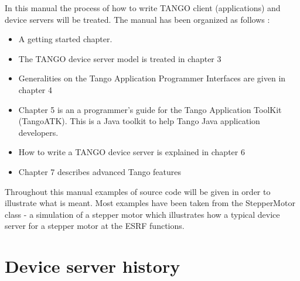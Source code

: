 In this manual the process of how to write TANGO client (applications)
and device servers will be treated. The manual has been organized
as follows :
\begin{itemize}
\item A getting started chapter. 
\item The TANGO device server model is treated in chapter 3 
\item Generalities on the Tango Application Programmer Interfaces are given
in chapter 4 
\item Chapter 5 is an a programmer's guide for the Tango Application ToolKit
(TangoATK). This is a Java toolkit to help Tango Java application
developers. 
\item How to write a TANGO device server is explained in chapter 6 
\item Chapter 7 describes advanced Tango features 
\end{itemize}
Throughout this manual examples of source code will be given in order
to illustrate what is meant. Most examples have been taken from the
StepperMotor class - a simulation of a stepper motor which illustrates
how a typical device server for a stepper motor at the ESRF functions.


\section{Device server history}

